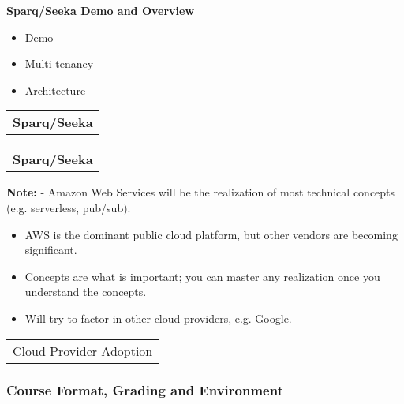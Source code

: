 \documentclass[11pt]{article}
\begin{document}
\textbf{Sparq/Seeka Demo and Overview}

\begin{itemize}
\item
  Demo
\item
  Multi-tenancy
\item
  Architecture
\end{itemize}

    \begin{longtable}[]{@{}c@{}}
\toprule
\tabularnewline
\midrule
\endhead
\textbf{Sparq/Seeka}\tabularnewline
\bottomrule
\end{longtable}

    \begin{longtable}[]{@{}c@{}}
\toprule
\tabularnewline
\midrule
\endhead
\textbf{Sparq/Seeka}\tabularnewline
\bottomrule
\end{longtable}

    \textbf{Note:} - Amazon Web Services will be the realization of most
technical concepts (e.g. serverless, pub/sub).

\begin{itemize}
\item
  AWS is the dominant public cloud platform, but other vendors are
  becoming significant.
\item
  Concepts are what is important; you can master any realization once
  you understand the concepts.
\item
  Will try to factor in other cloud providers, e.g. Google.
\end{itemize}

    \begin{longtable}[]{@{}c@{}}
\toprule
\tabularnewline
\midrule
\endhead
\href{https://www.rightscale.com/blog/cloud-industry-insights/cloud-computing-trends-2018-state-cloud-survey}{Cloud
Provider Adoption}\tabularnewline
\bottomrule
\end{longtable}

    \subsubsection{Course Format, Grading and
Environment}\label{course-format-grading-and-environment}
\end{document}
